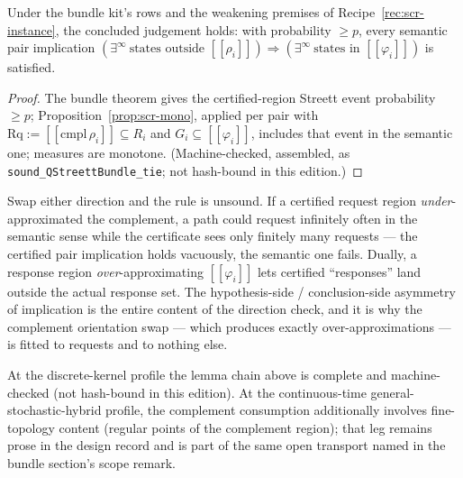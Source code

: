 \begin{bprop}\label{prop:scr-sound}
Under the bundle kit's rows and the weakening premises of
Recipe~\ref{rec:scr-instance}, the concluded judgement holds: with
probability $\ge p$, every semantic pair implication
$(\exists^\infty\ \text{states outside } [\![\rho_i]\!]) \Rightarrow
(\exists^\infty\ \text{states in } [\![\varphi_i]\!])$ is satisfied.
\end{bprop}
\begin{proof}
The bundle theorem gives the certified-region Streett event probability
$\ge p$; Proposition~\ref{prop:scr-mono}, applied per pair with
$\mathrm{Rq} := [\![\mathrm{cmpl}\,\rho_i]\!] \subseteq R_i$ and
$G_i \subseteq [\![\varphi_i]\!]$, includes that event in the semantic
one; measures are monotone. (Machine-checked, assembled, as
\texttt{sound\_QStreettBundle\_tie}; not hash-bound in this edition.)
\end{proof}

\begin{bremark}
Swap either direction and the rule is unsound. If a certified request
region \emph{under}-approximated the complement, a path could request
infinitely often in the semantic sense while the certificate sees only
finitely many requests --- the certified pair implication holds
vacuously, the semantic one fails. Dually, a response region
\emph{over}-approximating $[\![\varphi_i]\!]$ lets certified
``responses'' land outside the actual response set. The hypothesis-side
/ conclusion-side asymmetry of implication is the entire content of the
direction check, and it is why the complement orientation swap --- which
produces exactly over-approximations --- is fitted to requests and to
nothing else.
\end{bremark}

\begin{bremark}
At the discrete-kernel profile the lemma chain above is complete and
machine-checked (not hash-bound in this edition). At the continuous-time
general-stochastic-hybrid profile, the complement consumption
additionally involves fine-topology content (regular points of the
complement region); that leg remains prose in the design record and is
part of the same open transport named in the bundle section's scope
remark.
\end{bremark}

